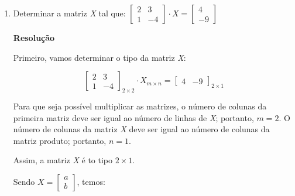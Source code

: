 \begin{exercise}\leavevmode
  \begin{enumerate}
    \item {
        Determinar a matriz \textit{X} tal que: $\begin{bmatrix}
          2 & 3 \\
          1 & -4
        \end{bmatrix} \cdot X = \begin{bmatrix}
          4 \\
          -9
        \end{bmatrix}$

        \vspace{.3cm}
        \textbf{Resolução}
        \vspace{.3cm}

        Primeiro, vamos determinar o tipo da matriz \textit{X}:

        \begin{equation*}
          \begin{bmatrix}
            2 & 3 \\
            1 & -4 
          \end{bmatrix}_{2 \times 2} \cdot X_{m \times n} = \begin{bmatrix}
            4 & -9
          \end{bmatrix}_{2 \times 1}
        \end{equation*}

        Para que seja possível multiplicar as matrizes, o número de colunas da primeira
        matriz deve ser igual ao número de linhas de \textit{X}; portanto, $m = 2$. O número 
        de colunas da matriz \textit{X} deve ser igual ao número de colunas da matriz produto; 
        portanto, $n = 1$.

        Assim, a matriz \textit{X} é to tipo $2 \times 1$.

        Sendo $X = \begin{bmatrix}
          a \\ b
        \end{bmatrix}$, temos:

}
\end{enumerate}
\end{exercise}
